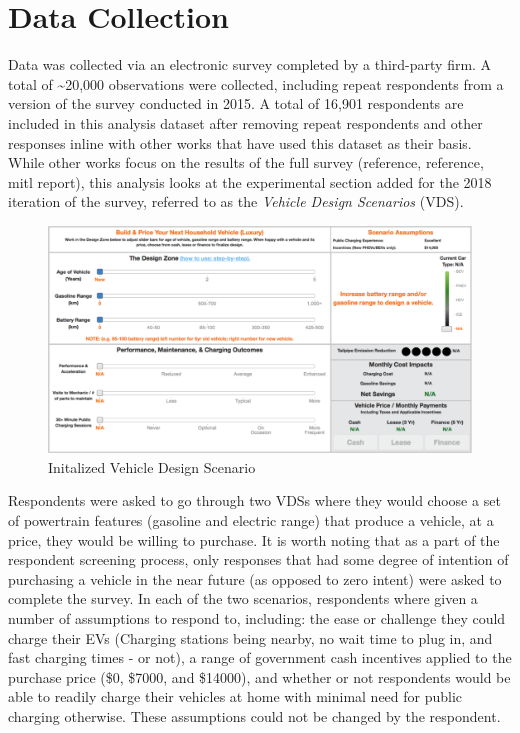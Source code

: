 \documentclass[]{elsarticle} %
\begin{document}
\section{Data Collection}\label{data-collection}

Data was collected via an electronic survey completed by a third-party
firm. A total of \textasciitilde{}20,000 observations were collected,
including repeat respondents from a version of the survey conducted in
2015. A total of 16,901 respondents are included in this analysis
dataset after removing repeat respondents and other responses inline
with other works that have used this dataset as their basis. While other
works focus on the results of the full survey (reference, reference,
mitl report), this analysis looks at the experimental section added for
the 2018 iteration of the survey, referred to as the \emph{Vehicle
Design Scenarios} (VDS).

\begin{figure}

{\centering \includegraphics[width=1\linewidth]{figures/VDS_Init} 

}

\caption{\label{fig:VDS-Int} Initalized Vehicle Design Scenario}\label{fig:fig-VDS-Int}
\end{figure}

Respondents were asked to go through two VDSs where they would choose a
set of powertrain features (gasoline and electric range) that produce a
vehicle, at a price, they would be willing to purchase. It is worth
noting that as a part of the respondent screening process, only
responses that had some degree of intention of purchasing a vehicle in
the near future (as opposed to zero intent) were asked to complete the
survey. In each of the two scenarios, respondents where given a number
of assumptions to respond to, including: the ease or challenge they
could charge their EVs (Charging stations being nearby, no wait time to
plug in, and fast charging times - or not), a range of government cash
incentives applied to the purchase price (\$0, \$7000, and \$14000), and
whether or not respondents would be able to readily charge their
vehicles at home with minimal need for public charging otherwise. These
assumptions could not be changed by the respondent.
\end{document}
